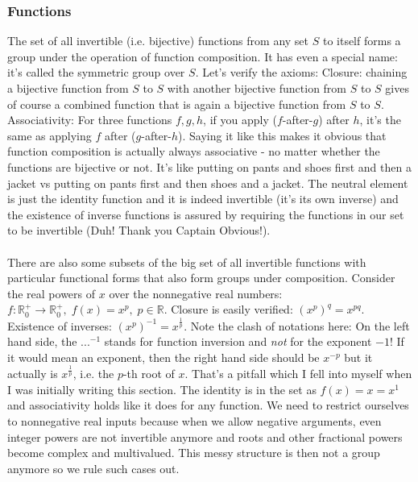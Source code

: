 
%


\subsubsection{Functions}
The set of all invertible (i.e. bijective) functions from any set $S$ to itself forms a group under the operation of function composition. It has even a special name: it's called the symmetric group over $S$. Let's verify the axioms: Closure: chaining a bijective function from $S$ to $S$ with another bijective function from $S$ to $S$ gives of course a combined function that is again a bijective function from $S$ to $S$. Associativity: For three functions $f,g,h$, if you apply ($f$-after-$g$) after $h$, it's the same as applying $f$ after ($g$-after-$h$). Saying it like this makes it obvious that function composition is actually always associative - no matter whether the functions are bijective or not. It's like putting on pants and shoes first and then a jacket vs putting on pants first and then shoes and a jacket. The neutral element is just the identity function and it is indeed invertible (it's its own inverse) and the existence of inverse functions is assured by requiring the functions in our set to be invertible (Duh! Thank you Captain Obvious!).

\paragraph{} There are also some subsets of the big set of all invertible functions with particular functional forms that also form groups under composition. Consider the real powers of $x$ over the nonnegative real numbers: $f: \mathbb{R}^+_0 \rightarrow \mathbb{R}^+_0, \; f(x) = x^p, \; p \in \mathbb{R}$. Closure is easily verified: $(x^p)^q = x^{p q}$. Existence of inverses: $(x^p)^{-1} = x^{\frac{1}{p}}$. Note the clash of notations here: On the left hand side, the $...^{-1}$ stands for function inversion and \emph{not} for the exponent $-1$! If it would mean an exponent, then the right hand side should be $x^{-p}$ but it actually is $x^{\frac{1}{p}}$, i.e. the $p$-th root of $x$. That's a pitfall which I fell into myself when I was initially writing this section. The identity is in the set as $f(x) = x = x^1$ and associativity holds like it does for any function. We need to restrict ourselves to nonnegative real inputs because when we allow negative arguments, even integer powers are not invertible anymore and roots and other fractional powers become complex and multivalued. This messy structure is then not a group anymore so we rule such cases out.

